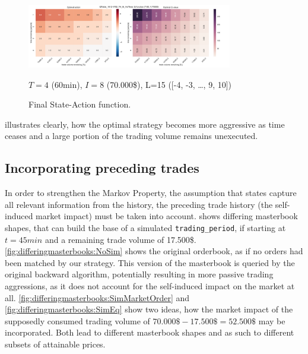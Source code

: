 \begin{figure}[ht]
	\centering
   \includegraphics[width=0.8\textwidth]{content/drawings/heatmap_3months}
	\caption{Final State-Action function.}
	\small $T=4$ (60min), $I=8$ (70.000\$), L=15 ([-4, -3, \ldots{}, 9, 10])
	\label{fig:heatmap}
\end{figure}

 illustrates clearly, how the optimal strategy becomes more aggressive as time ceases and a large portion of the trading volume remains unexecuted.\\

\subsection{Incorporating preceding trades}
\label{chap:backwardapproach:precedingTrades}
In order to strengthen the Markov Property, \ie the assumption that states capture all relevant information from the history, the preceding trade history  (\ie the self-induced market impact) must be taken into account.  shows differing masterbook shapes, that can build the base of a simulated \lstinline!trading_period!, \eg if starting at $t=45min$ and a remaining trade volume of 17.500\$. \ref{fig:differingmasterbooks:NoSim} shows the original orderbook, as if no orders had been matched by our strategy. This version of the masterbook is queried by the original backward algorithm, potentially resulting in more passive trading aggressions, as it does not account for the self-induced impact on the market at all. \ref{fig:differingmasterbooks:SimMarketOrder} and \ref{fig:differingmasterbooks:SimEq} show two ideas, how the market impact of the supposedly consumed trading volume of $70.000\$-17.500\$ = 52.500\$$ may be incorporated. Both lead to different masterbook shapes and as such to different subsets of attainable prices.\\

